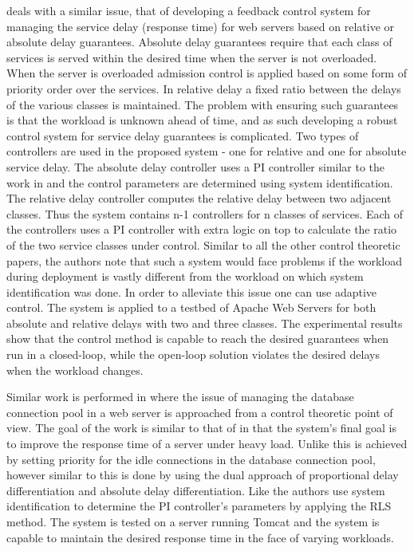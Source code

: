 \cite{related:control4} deals with a similar issue, that of developing a feedback control system for managing the service delay (response time) for web servers based on relative or absolute delay guarantees. Absolute delay guarantees require that each class of services is served within the desired time when the server is not overloaded. When the server is overloaded admission control is applied based on some form of priority order over the services. In relative delay a fixed ratio between the delays of the various classes is maintained. The problem with ensuring such guarantees is that the workload is unknown ahead of time, and as such developing a robust control system for service delay guarantees is complicated. Two types of controllers are used in the proposed system - one for relative and one for absolute service delay. The absolute delay controller uses a PI controller similar to the work in \cite{related:control3} and the control parameters are determined using system identification. The relative delay controller computes the relative delay between two adjacent classes. Thus the system contains n-1 controllers for n classes of services. Each of the controllers uses a PI controller with extra logic on top to calculate the ratio of the two service classes under control. Similar to all the other control theoretic papers, the authors note that such a system would face problems if the workload during deployment is vastly different from the workload on which system identification was done. In order to alleviate this issue one can use adaptive control. The system is applied to a testbed of Apache Web Servers for both absolute and relative delays with two and three classes. The experimental results show that the control method is capable to reach the desired guarantees when run in a closed-loop, while the open-loop solution violates the desired delays when the workload changes.

Similar work is performed in \cite{related:control5} where the issue of managing the database connection pool in a web server is approached from a control theoretic point of view. The goal of the work is similar to that of \cite{related:control4} in that the system's final goal is to improve the response time of a server under heavy load. Unlike \cite{related:control4} this is achieved by setting priority for the idle connections in the database connection pool, however similar to \cite{related:control4} this is done by using the dual approach of proportional delay differentiation and absolute delay differentiation. Like \cite{related:control4} the authors use system identification to determine the PI controller's parameters by applying the RLS method. The system is tested on a server running Tomcat and the system is capable to maintain the desired response time in the face of varying workloads.

